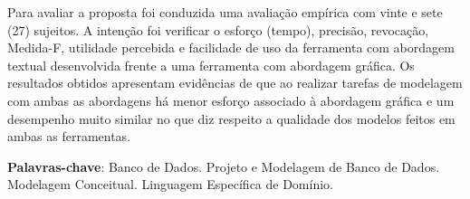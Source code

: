 \begin{resumo}
Para avaliar a proposta foi conduzida uma avaliação empírica com vinte e sete (27) sujeitos.
A intenção foi verificar o esforço (tempo), precisão, revocação, Medida-F, utilidade percebida e facilidade de uso da ferramenta com abordagem textual desenvolvida frente a uma ferramenta com abordagem gráfica.
Os resultados obtidos apresentam evidências de que ao realizar tarefas de modelagem com ambas as abordagens há menor esforço associado à abordagem gráfica e um desempenho muito similar no que diz respeito a qualidade dos modelos feitos em ambas as ferramentas. 
\vspace{\onelineskip}
    
\noindent
\textbf{Palavras-chave}: Banco de Dados. Projeto e Modelagem de Banco de Dados. Modelagem Conceitual. Linguagem Específica de Domínio.
\end{resumo}
